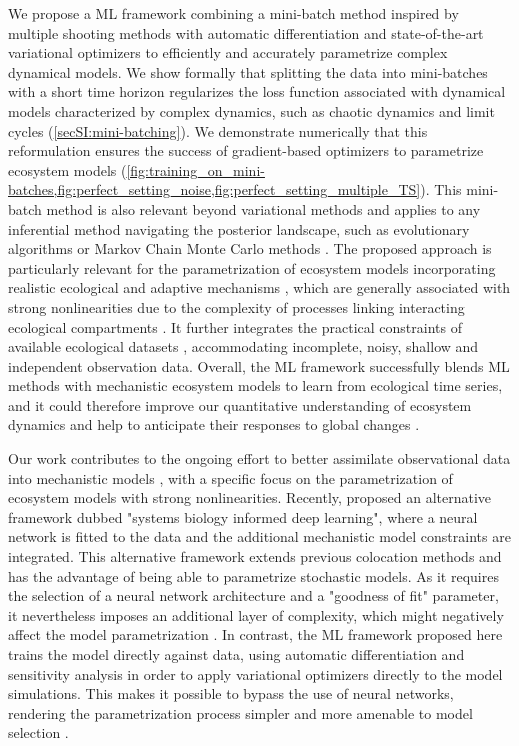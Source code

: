 We propose a ML framework combining a mini-batch method inspired by multiple shooting methods \citep{Pisarenko2004} with automatic differentiation \citep{Rackauckas2020a} and state-of-the-art variational optimizers \citep{Kingma2014} to efficiently and accurately parametrize complex dynamical models. 
% 
We show formally that splitting the data into mini-batches with a short time horizon regularizes the loss function associated with dynamical models characterized by complex dynamics, such as chaotic dynamics and limit cycles (\cref{secSI:mini-batching}). We demonstrate numerically that this reformulation ensures the success of gradient-based optimizers to parametrize ecosystem models (\cref{fig:training_on_mini-batches,fig:perfect_setting_noise,fig:perfect_setting_multiple_TS}).
% 
This mini-batch method is also relevant beyond variational methods and applies to any inferential method navigating the posterior landscape, such as evolutionary algorithms \citep{wilke2001evolution,Rodriguez-Fernandez2006} or Markov Chain Monte Carlo methods \citep{Lignell2013,Higgins2010,Xu2006,Fiechter2013,Rosenbaum2019}.
% 
The proposed approach is particularly relevant for the parametrization of ecosystem models incorporating realistic ecological and adaptive mechanisms \citep{Urban2016}, which are generally associated with strong nonlinearities due to the complexity of processes linking interacting ecological compartments \citep{Bjornstad2001,Hastings1993,Huisman1999,Beninca2008}. It further integrates the practical constraints of available ecological datasets \citep{Dornelas2018}, accommodating incomplete, noisy, shallow and independent observation data.
Overall, the ML framework successfully blends ML methods with mechanistic ecosystem models to learn from ecological time series, and it could therefore improve our quantitative understanding of ecosystem dynamics and help to anticipate their responses to global changes \citep{Urban2016}.

Our work contributes to the ongoing effort to better assimilate observational data into mechanistic models \citep{Schartau2017,Raissi2019,Kashinath2021}, with a specific focus on the parametrization of ecosystem models with strong nonlinearities.
%
Recently, \citep{Yazdani2020} proposed an alternative framework dubbed "systems biology informed deep learning", where a neural network is fitted to the data and the additional mechanistic model constraints are integrated. This alternative framework extends previous colocation methods \citep{Ramsay2007,Cao2008} and has the advantage of being able to parametrize stochastic models. As it requires the selection of a neural network architecture and a "goodness of fit" parameter, it nevertheless imposes an additional layer of complexity, which might negatively affect the model parametrization  \citep{Yazdani2020}. 
% 
In contrast, the ML framework proposed here trains the model directly against data, using automatic differentiation and sensitivity analysis in order to apply variational optimizers directly to the model simulations. This makes it possible to bypass the use of neural networks, rendering the parametrization process simpler and more amenable to model selection \citep{Ramsay2007}. 
% 

